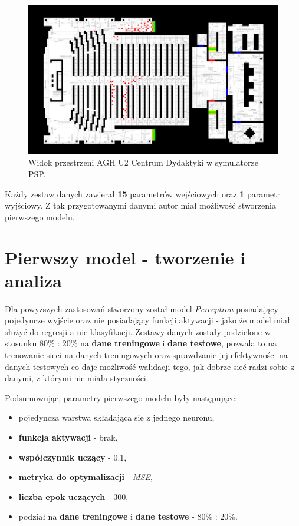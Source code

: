 \documentclass[12pt]{aghdpl}
\newenvironment{tightcenter}{
  \setlength\topsep{0pt}
  \setlength\parskip{0pt}
  \begin{center}
}{
  \end{center}
}
\begin{document}
		\begin{figure}[h]
			\begin{tightcenter}
			 	\includegraphics[width = \linewidth]{rysunki/agh_u2.png}
			\end{tightcenter}	 			
			 			
		 	\caption{Widok przestrzeni AGH U2 Centrum Dydaktyki w symulatorze PSP.}
			\label{fig: agh_u2_centrum_dydaktyki}
		\end{figure}
		
		Każdy zestaw danych zawierał \textbf{15} parametrów wejściowych oraz \textbf{1} parametr wyjściowy. Z tak przygotowanymi danymi autor miał możliwość stworzenia pierwszego modelu.
		
		\section{Pierwszy model - tworzenie i analiza} \label{pierwszy_model_tworzenie_i_analiza}
		Dla powyższych zastosowań stworzony został model \textit{Perceptron} posiadający pojedyncze wyjście oraz nie posiadający funkcji aktywacji - jako że model miał służyć do regresji a nie klasyfikacji. Zestawy danych zostały podzielone w stosunku 80\% : 20\% na \textbf{dane treningowe} i \textbf{dane testowe}, pozwala to na trenowanie sieci na danych treningowych oraz sprawdzanie jej efektywności na danych testowych co daje możliwość walidacji tego, jak dobrze sieć radzi sobie z danymi, z którymi nie miała styczności.
		
		Podsumowując, parametry pierwszego modelu były następujące:
		\begin{itemize}
		\item pojedyncza warstwa składająca się z jednego neuronu,
		\item \textbf{funkcja aktywacji} - brak,
		\item \textbf{współczynnik uczący} - 0.1,
		\item \textbf{metryka do optymalizacji} - \textit{MSE},
		\item \textbf{liczba epok uczących} - 300,
		\item podział na \textbf{dane treningowe} i \textbf{dane testowe} - 80\% : 20\%.
		\end{itemize}
				
\end{document}
